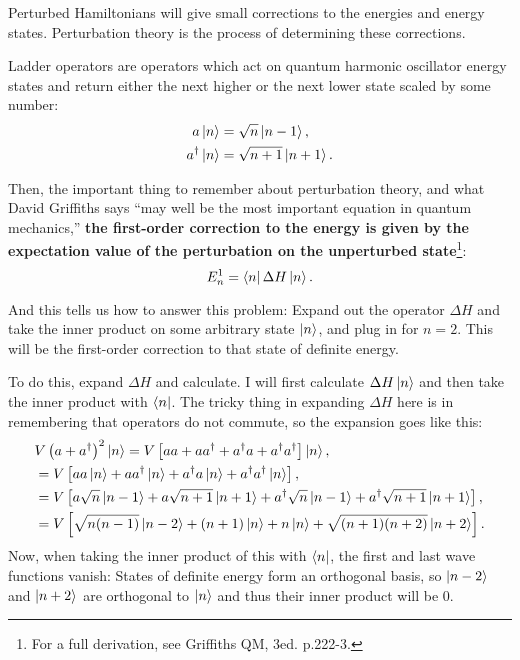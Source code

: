 \documentclass[11pt]{paper}
\begin{document}
Perturbed Hamiltonians will give small corrections to the energies and energy states.  Perturbation theory is the process of determining these corrections.

Ladder operators are operators which act on quantum harmonic oscillator energy states and return either the next higher or the next lower state scaled by some number:
\begin{align}
	a\ket{n} &= \sqrt{n}\ket{n-1},\\
	a^\dagger\ket{n} &= \sqrt{n+1}\ket{n+1}.
\end{align}

Then, the important thing to remember about perturbation theory, and what David Griffiths says ``may well be the most important equation in quantum mechanics,'' \textbf{the first-order correction to the energy is given by the expectation value of the perturbation on the unperturbed state}\footnote{For a full derivation, see Griffiths QM, 3ed. p.222-3.}:
\begin{equation}
	E_n^1 = \bra{n}\Delta H\ket{n}.
\end{equation}

And this tells us how to answer this problem: Expand out the operator $\Delta H$ and take the inner product on some arbitrary state $\ket{n}$, and plug in for $n=2$.  This will be the first-order correction to that state of definite energy.

To do this, expand $\Delta H$ and calculate.  I will first calculate $\Delta H\ket{n}$ and then take the inner product with $\bra{n}$.  The tricky thing in expanding $\Delta H$ here is in remembering that operators do not commute, so the expansion goes like this:
\begin{align}
	&V\left(a+a^\dagger\right)^2\ket{n} = V\left[aa + aa^\dagger + a^\dagger a + a^\dagger a^\dagger\right]\ket{n},\\
	&= V\left[aa\ket{n} + aa^\dagger\ket{n} + a^\dagger a\ket{n} + a^\dagger a^\dagger\ket{n}\right],\\
	&= V\left[a\sqrt{n}\ket{n-1} + a\sqrt{n+1}\ket{n+1} + a^\dagger \sqrt{n}\ket{n-1} + a^\dagger \sqrt{n+1}\ket{n+1}\right],\\
	&=V\left[\sqrt{n(n-1)}\ket{n-2} + (n+1)\ket{n} + n\ket{n} + \sqrt{(n+1)(n+2)}\ket{n+2}\right].
\end{align}
Now, when taking the inner product of this with $\bra{n}$, the first and last wave functions vanish:  States of definite energy form an orthogonal basis, so $\ket{n-2}$ and $\ket{n+2}$ are orthogonal to $\ket{n}$ and thus their inner product will be 0.
\end{document}
